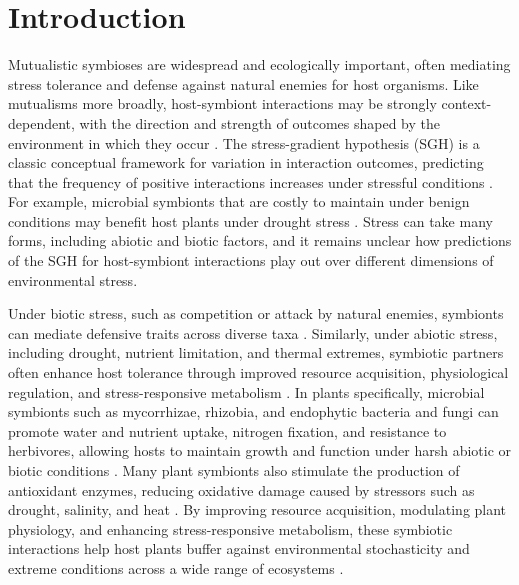 \documentclass[12pt]{article}\usepackage[]{graphicx}\usepackage[dvipsnames]{xcolor}
\begin{document}
\section*{Introduction}
Mutualistic symbioses are widespread and ecologically important, often mediating stress tolerance and defense against natural enemies for host organisms. 
Like mutualisms more broadly, host-symbiont interactions may be strongly context-dependent, with the direction and strength of outcomes shaped by the environment in which they occur \citep{hoeksema2015context, bronstein1994conditional,hoang2024impacts,rudgers2020climate}. 
The stress-gradient hypothesis (SGH) is a classic conceptual framework for variation in interaction outcomes, predicting that the frequency of positive interactions increases under stressful conditions \citep{louthan2015and,bertness1994positive,holmgren2010strong,maestre2009refining}.
For example, microbial symbionts that are costly to maintain under benign conditions may benefit host plants under drought stress  \citep{giauque2019endophyte}. 
Stress can take many forms, including abiotic and biotic factors, and it remains unclear how predictions of the SGH for host-symbiont interactions play out over different dimensions of environmental stress. 

Under biotic stress, such as competition or attack by natural enemies, symbionts can mediate defensive traits across diverse taxa \citep{atala2022fungal,bastias2017epichloe,vega2008insect,haine2008symbiont,florez2015defensive}.
Similarly, under abiotic stress, including drought, nutrient limitation, and thermal extremes, symbiotic partners often enhance host tolerance through improved resource acquisition, physiological regulation, and stress-responsive metabolism \citep{clay2002evolutionary, afkhami2008symbiosis,cesar2024defensive}. 
In plants specifically, microbial symbionts such as mycorrhizae, rhizobia, and endophytic bacteria and fungi can promote water and nutrient uptake, nitrogen fixation, and resistance to herbivores, allowing hosts to maintain growth and function under harsh abiotic or biotic conditions \citep{amijee1989development, friesen2011microbially,van2015mycorrhizal}.
Many plant symbionts also stimulate the production of antioxidant enzymes, reducing oxidative damage caused by stressors such as drought, salinity, and heat \citep{ruiz1996superoxide}. 
By improving resource acquisition, modulating plant physiology, and enhancing stress-responsive metabolism, these symbiotic interactions help host plants buffer against environmental stochasticity and extreme conditions across a wide range of ecosystems \citep{fowler2023geographic,rudgers2020climate,li2026climate}.
\end{document}
